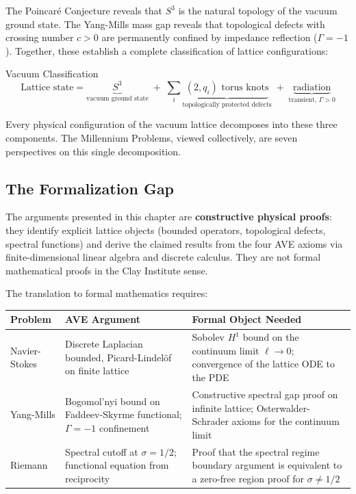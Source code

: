 The Poincar\'e Conjecture reveals that $S^3$ is the natural topology of the vacuum ground state. The Yang-Mills mass gap reveals that topological defects with crossing number $c > 0$ are permanently confined by impedance reflection ($\Gamma = -1$\gammaundeclared{}). Together, these establish a complete classification of lattice configurations:

\begin{resultbox}{Vacuum Classification}
\begin{equation}
    \text{Lattice state} = \underbrace{S^3}_{\text{vacuum ground state}} \;+\; \sum_{i} \underbrace{(2,q_i)\text{ torus knots}}_{\text{topologically protected defects}} \;+\; \underbrace{\text{radiation}}_{\text{transient, } \Gamma > 0}
\end{equation}
\end{resultbox}

Every physical configuration of the vacuum lattice decomposes into these three components. The Millennium Problems, viewed collectively, are seven perspectives on this single decomposition.

\subsection{The Formalization Gap}
\label{sec:formalization_gap}

The arguments presented in this chapter are \textbf{constructive physical proofs}: they identify explicit lattice objects (bounded operators, topological defects, spectral functions) and derive the claimed results from the four AVE axioms via finite-dimensional linear algebra and discrete calculus. They are not formal mathematical proofs in the Clay Institute sense.

The translation to formal mathematics requires:

\begin{center}
\renewcommand{\arraystretch}{1.3}
\small
\begin{tabularx}{\textwidth}{@{}l X X@{}}
\toprule
\textbf{Problem} & \textbf{AVE Argument} & \textbf{Formal Object Needed} \\
\midrule
Navier-Stokes & Discrete Laplacian bounded, Picard-Lindel\"of on finite lattice & Sobolev $H^1$ bound on the continuum limit $\ell \to 0$; convergence of the lattice ODE to the PDE \\
Yang-Mills & Bogomol'nyi bound on Faddeev-Skyrme functional; $\Gamma = -1$\gammaundeclared{} confinement & Constructive spectral gap proof on infinite lattice; Osterwalder-Schrader axioms for the continuum limit \\
Riemann & Spectral cutoff at $\sigma = 1/2$; functional equation from reciprocity & Proof that the spectral regime boundary argument is equivalent to a zero-free region proof for $\sigma \neq 1/2$ \\
\bottomrule
\end{tabularx}
\end{center}

